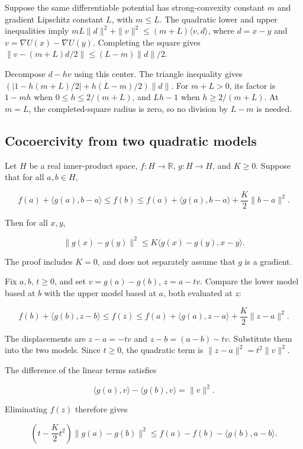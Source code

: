 \documentclass[11pt,a4paper]{article}
\begin{document}
Suppose the same differentiable potential has strong-convexity constant \(m\) and gradient Lipschitz constant \(L\), with \(m\le L\). The quadratic lower and upper inequalities imply \(mL\|d\|^2+\|v\|^2\le(m+L)\langle v,d\rangle\), where \(d=x-y\) and \(v=\nabla U(x)-\nabla U(y)\). Completing the square gives \(\|v-(m+L)d/2\|\le(L-m)\|d\|/2\).



Decompose \(d-hv\) using this center. The triangle inequality gives \((|1-h(m+L)/2|+h(L-m)/2)\|d\|\). For \(m+L>0\), its factor is \(1-mh\) when \(0\le h\le2/(m+L)\), and \(Lh-1\) when \(h\ge2/(m+L)\). At \(m=L\), the completed-square radius is zero, so no division by \(L-m\) is needed.


\subsection{\texorpdfstring{Cocoercivity from two quadratic models}{Cocoercivity from two quadratic models}}


Let \(H\) be a real inner-product space, \(f:H\to\mathbb R\), \(g:H\to H\), and \(K\ge0\). Suppose that for all \(a,b\in H\),

\[f(a)+\langle g(a),b-a\rangle\le f(b)\le f(a)+\langle g(a),b-a\rangle+\frac K2\|b-a\|^2.\]

Then for all \(x,y\),

\[\|g(x)-g(y)\|^2\le K\langle g(x)-g(y),x-y\rangle.\]

The proof includes \(K=0\), and does not separately assume that \(g\) is a gradient.



Fix \(a,b\), \(t\ge0\), and set \(v=g(a)-g(b)\), \(z=a-tv\). Compare the lower model based at \(b\) with the upper model based at \(a\), both evaluated at \(z\):

\[f(b)+\langle g(b),z-b\rangle\le f(z)\le f(a)+\langle g(a),z-a\rangle+\frac K2\|z-a\|^2.\]

The displacements are \(z-a=-tv\) and \(z-b=(a-b)-tv\). Substitute them into the two models. Since \(t\ge0\), the quadratic term is \(\|z-a\|^2=t^2\|v\|^2\).



The difference of the linear terms satisfies

\[\langle g(a),v\rangle-\langle g(b),v\rangle=\|v\|^2.\]

Eliminating \(f(z)\) therefore gives

\[\left(t-\frac K2t^2\right)\|g(a)-g(b)\|^2\le f(a)-f(b)-\langle g(b),a-b\rangle.\]
\end{document}
